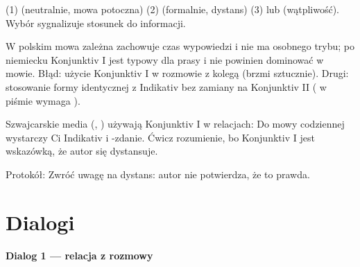 \begin{zasada}
(1)  (neutralnie, mowa potoczna) (2)  (formalnie, dystans) (3)  lub  (wątpliwość). Wybór sygnalizuje stosunek do informacji.
\end{zasada}

\begin{falle}
W polskim mowa zależna zachowuje czas wypowiedzi i nie ma osobnego trybu; po niemiecku Konjunktiv I jest typowy dla prasy i
nie powinien dominować w mowie. Błąd: użycie Konjunktiv I w rozmowie z kolegą (brzmi sztucznie). Drugi: stosowanie formy identycznej
z Indikativ bez zamiany na Konjunktiv II ( w piśmie wymaga ).
\end{falle}

\begin{szwajcaria}
Szwajcarskie media (, ) używają Konjunktiv I w relacjach: 
Do mowy codziennej wystarczy Ci Indikativ i -zdanie. Ćwicz rozumienie, bo Konjunktiv I jest wskazówką, że autor się dystansuje.
\end{szwajcaria}

\begin{praca}
Protokół:   Zwróć uwagę na dystans: autor nie potwierdza, że to prawda.
\end{praca}

\section{Dialogi}
\textbf{Dialog 1 --- relacja z rozmowy}
\begin{dialog}
\end{dialog}

